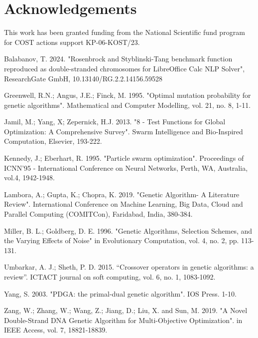 \documentclass[runningheads]{llncs}
\begin{document}
\section*{Acknowledgements} This work has been granted funding from the National Scientific fund program for COST actions support KP-06-KOST/23.

\begin{thebibliography}{8}

 Balabanov, T. 2024. "Rosenbrock and Styblinski-Tang benchmark function reproduced as double-stranded chromosomes for LibreOffice Calc NLP Solver", ResearchGate GmbH, 10.13140/RG.2.2.14156.59528

 Greenwell, R.N.; Angus, J.E.; Finck, M. 1995. "Optimal mutation probability for genetic algorithms". Mathematical and Computer Modelling, vol. 21, no. 8, 1-11.

 Jamil, M.; Yang, X; Zepernick, H.J. 2013. "8 - Test Functions for Global Optimization: A Comprehensive Survey". Swarm Intelligence and Bio-Inspired Computation, Elsevier, 193-222.

 Kennedy, J.; Eberhart, R. 1995. "Particle swarm optimization". Proceedings of ICNN'95 - International Conference on Neural Networks, Perth, WA, Australia, vol.4, 1942-1948.

 Lambora, A.; Gupta, K.; Chopra, K. 2019. "Genetic Algorithm- A Literature Review". International Conference on Machine Learning, Big Data, Cloud and Parallel Computing (COMITCon), Faridabad, India, 380-384.

 Miller, B. L.; Goldberg, D. E. 1996. "Genetic Algorithms, Selection Schemes, and the Varying Effects of Noise" in Evolutionary Computation, vol. 4, no. 2, pp. 113-131.

 Umbarkar, A. J.; Sheth, P. D. 2015. “Crossover operators in genetic algorithms: a review”. ICTACT journal on soft computing, vol. 6, no. 1, 1083-1092.

 Yang, S. 2003. "PDGA: the primal-dual genetic algorithm". IOS Press. 1-10.

 Zang, W.; Zhang, W.; Wang, Z.; Jiang, D.; Liu, X. and Sun, M. 2019. "A Novel Double-Strand DNA Genetic Algorithm for Multi-Objective Optimization". in IEEE Access, vol. 7, 18821-18839.

\end{thebibliography}
\end{document}
